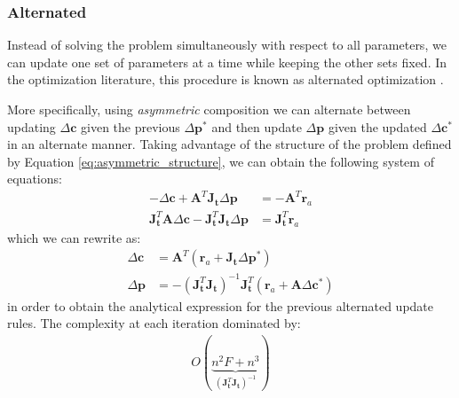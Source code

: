 \subsubsection*{Alternated}
\label{sec:gauss_newton_alternated}

Instead of solving the problem simultaneously with respect to all parameters, we can update one set of parameters at a time while keeping the other sets fixed. In the optimization literature, this procedure is known as alternated optimization \cite{DelaTorre2012}.

More specifically, using \emph{asymmetric} composition we can alternate between updating $\Delta\mathbf{c}$ given the previous $\Delta\mathbf{p}^*$ and then update $\Delta\mathbf{p}$ given the updated $\Delta\mathbf{c}^*$ in an alternate manner. Taking advantage of the structure of the problem defined by Equation \ref{eq:asymmetric_structure}, we can obtain the following system of equations:
\begin{equation}
    \begin{aligned}
        -\Delta\mathbf{c} + \mathbf{A}^T \mathbf{J}_{\mathbf{t}} \Delta\mathbf{p} & = -\mathbf{A}^T \mathbf{r}_a
        \\
        \mathbf{J}_{\mathbf{t}}^T \mathbf{A} \Delta\mathbf{c} - \mathbf{J}_{\mathbf{t}}^T \mathbf{J}_{\mathbf{t}} \Delta\mathbf{p} & = \mathbf{J}_\mathbf{t}^T \mathbf{r}_a
    \label{eq:asymmetric_alt_system}
    \end{aligned}
\end{equation}
which we can rewrite as:
\begin{equation}
    \begin{aligned}
        \Delta\mathbf{c} & = \mathbf{A}^T \left( \mathbf{r}_a + \mathbf{J}_{\mathbf{t}} \Delta\mathbf{p}^* \right)
        \\
        \Delta\mathbf{p}& = -\left(\mathbf{J}_{\mathbf{t}}^T\mathbf{J}_{\mathbf{t}}\right)^{-1} \mathbf{J}_{\mathbf{t}}^T \left( \mathbf{r}_a + \mathbf{A} \Delta\mathbf{c}^* \right)
        \label{eq:asymmetric_alt_solution}
    \end{aligned}
\end{equation}
in order to obtain the analytical expression for the previous alternated update rules. The complexity at each iteration dominated by:
\begin{equation}
    \begin{aligned}
        O(\underbrace{n^2F + n^3}_{(\mathbf{J}_{\mathbf{t}}^T\mathbf{J}_{\mathbf{t}})^{-1}})
    \label{eq:complexity_alternated_asymmetric}
    \end{aligned}
\end{equation}

